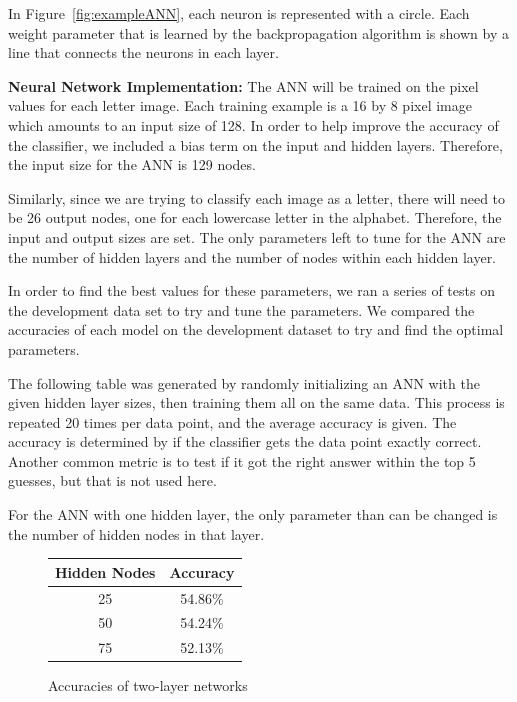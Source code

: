 \documentclass[11pt,letterpaper]{article}
\begin{document}
In Figure~\ref{fig:exampleANN}, each neuron is represented with a circle. Each weight parameter that is learned by the
backpropagation algorithm is shown by a line that connects the neurons in each layer.

{\bf Neural Network Implementation:} The ANN will be trained on the pixel values for each letter image. Each training example is a 16 by
8 pixel image which amounts to an input size of 128. In order to help improve the accuracy of the
classifier, we included a bias term on the input and hidden layers. Therefore, the input size for
the ANN is 129 nodes.

Similarly, since we are trying to classify each image as a letter, there will need to be 26 output
nodes, one for each lowercase letter in the alphabet. Therefore, the input and output sizes are set.
The only parameters left to tune for the ANN are the number of hidden layers and the number of nodes
within each hidden layer.

In order to find the best values for these parameters, we ran a series of tests on the development
data set to try and tune the parameters. We compared the accuracies of each model on the development
dataset to try and find the optimal parameters.

The following table was generated by randomly initializing an ANN with the given hidden layer sizes, then
training them all on the same data. This process is repeated 20 times per data point, and the
average accuracy is given. The accuracy is determined by if the classifier gets the data point
exactly correct. Another common metric is to test if it got the right answer within the top 5
guesses, but that is not used here.

For the ANN with one hidden layer, the only parameter than can be changed is the number of hidden nodes in that layer.

\begin{figure}[h]
    \caption{Accuracies of two-layer networks}
    \centering
    \begin{tabular}{|c|c|}
        \hline 
        Hidden Nodes & Accuracy \\ 
        \hline 
        25 & 54.86\% \\ 
        \hline 
        50 & 54.24\% \\ 
        \hline 
        75 & 52.13\% \\ 
        \hline 
    \end{tabular} 
\end{figure}
\end{document}
